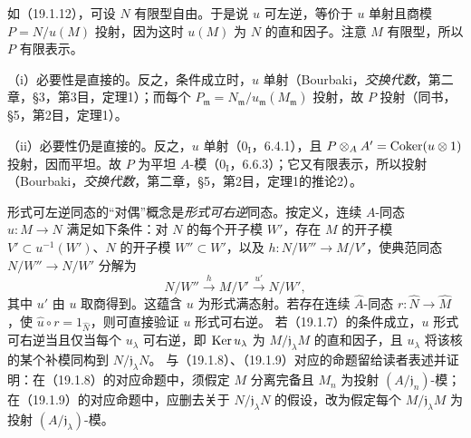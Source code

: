 如（19.1.12），可设 $N$ 有限型自由。于是说 $u$ 可左逆，等价于 $u$ 单射且商模 $P=N/u(M)$ 投射，因为这时 $u(M)$ 为 $N$ 的直和因子。注意 $M$ 有限型，所以 $P$ 有限表示。

（i）必要性是直接的。反之，条件成立时，$u$ 单射（Bourbaki，\textit{交换代数}，第二章，§3，第3目，定理1）；而每个 $P_{\mathfrak m}=N_{\mathfrak m}/u_{\mathfrak m}(M_{\mathfrak m})$ 投射，故 $P$ 投射（同书，§5，第2目，定理1）。

（ii）必要性仍是直接的。反之，$u$ 单射（$0_{\mathrm I}$，6.4.1），且 $P\otimes_AA'=\operatorname{Coker}(u\otimes1)$ 投射，因而平坦。故 $P$ 为平坦 $A$-模（$0_{\mathrm I}$，6.6.3）；它又有限表示，所以投射（Bourbaki，\textit{交换代数}，第二章，§5，第2目，定理1的推论2）。

形式可左逆同态的“对偶”概念是\emph{形式可右逆}同态。按定义，连续 $A$-同态 $u:M\to N$ 满足如下条件：对 $N$ 的每个开子模 $W'$，存在 $M$ 的开子模 $V'\subset u^{-1}(W')$、$N$ 的开子模 $W''\subset W'$，以及 $h:N/W''\to M/V'$，使典范同态 $N/W''\to N/W'$ 分解为
\[
 N/W''\xrightarrow{h}M/V'\xrightarrow{u'}N/W',
\]
其中 $u'$ 由 $u$ 取商得到。这蕴含 $u$ 为形式满态射。若存在连续 $\widehat A$-同态 $r:\widehat N\to\widehat M$，使 $\widehat u\circ r=1_{\widehat N}$，则可直接验证 $u$ 形式可右逆。
若（19.1.7）的条件成立，$u$ 形式可右逆当且仅当每个 $u_\lambda$ 可右逆，即 $\operatorname{Ker} u_\lambda$ 为 $M/\mathfrak j_\lambda M$ 的直和因子，且 $u_\lambda$ 将该核的某个补模同构到 $N/\mathfrak j_\lambda N$。
与（19.1.8）、（19.1.9）对应的命题留给读者表述并证明：在（19.1.8）的对应命题中，须假定 $M$ 分离完备且 $M_n$ 为投射 $(A/\mathfrak j_n)$-模；在（19.1.9）的对应命题中，应删去关于 $N/\mathfrak j_\lambda N$ 的假设，改为假定每个 $M/\mathfrak j_\lambda M$ 为投射 $(A/\mathfrak j_\lambda)$-模。
